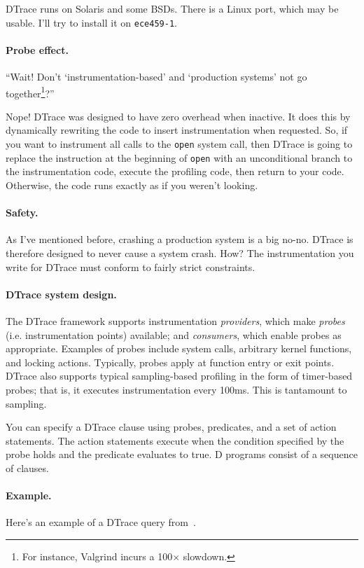 \documentclass[11pt]{article}
\begin{document}
DTrace runs on Solaris and some BSDs. There is a Linux port, which may be usable.
I'll try to install it on {\tt ece459-1}.

\paragraph{Probe effect.} ``Wait! Don't `instrumentation-based' 
and `production systems' not go together\footnote{For instance, Valgrind incurs a 100$\times$
slowdown.}?''

Nope! DTrace was designed to have zero overhead when inactive. It does
this by dynamically rewriting the code to insert instrumentation when
requested. So, if you want to instrument all calls to the {\tt open}
system call, then DTrace is going to replace the instruction at the
beginning of {\tt open} with an unconditional branch to the
instrumentation code, execute the profiling code, then return to your
code. Otherwise, the code runs exactly as if you weren't looking.

\paragraph{Safety.} As I've mentioned before, crashing a production
system is a big no-no. DTrace is therefore designed to never cause a
system crash. How? The instrumentation you write for DTrace 
must conform to fairly strict constraints.

\paragraph{DTrace system design.} The DTrace framework supports instrumentation
\emph{providers}, which make \emph{probes} (i.e.  instrumentation
points) available; and \emph{consumers}, which enable probes as
appropriate. Examples of probes include system calls, arbitrary kernel
functions, and locking actions. Typically, probes apply at function entry or exit points.
DTrace also supports typical
sampling-based profiling in the form of timer-based probes; that is,
it executes instrumentation every 100ms. This is tantamount to
sampling.

You can specify a DTrace clause using probes, predicates, and a set of
action statements. The action statements execute when the condition
specified by the probe holds and the predicate evaluates to true. D
programs consist of a sequence of clauses.

\paragraph{Example.} Here's an example of a DTrace query from~\cite{Cantrill:2004:DIP:1247415.1247417}.
\end{document}
